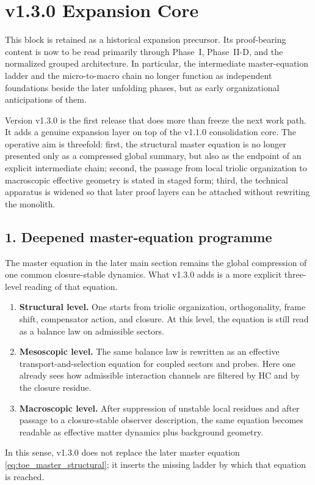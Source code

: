 \section*{v1.3.0 Expansion Core}

\begin{remark}
\label{rem:normalization-note-v130}
This block is retained as a historical expansion precursor. Its proof-bearing content is now to be read primarily through Phase~I, Phase~II-D, and the normalized grouped architecture. In particular, the intermediate master-equation ladder and the micro-to-macro chain no longer function as independent foundations beside the later unfolding phases, but as early organizational anticipations of them.
\end{remark}

Version v1.3.0 is the first release that does more than freeze the next
work path. It adds a genuine expansion layer on top of the v1.1.0
consolidation core. The operative aim is threefold: first, the structural
master equation is no longer presented only as a compressed global summary, but
also as the endpoint of an explicit intermediate chain; second, the passage
from local triolic organization to macroscopic effective geometry is stated in
staged form; third, the technical apparatus is widened so that later proof
layers can be attached without rewriting the monolith.

\subsection*{1. Deepened master-equation programme}
The master equation in the later main section remains the global compression of
one common closure-stable dynamics. What v1.3.0 adds is a more explicit
three-level reading of that equation.
\begin{enumerate}[leftmargin=2em,label=(\roman*)]
  \item \textbf{Structural level.} One starts from triolic organization,
  orthogonality, frame shift, compensator action, and closure. At this level,
  the equation is still read as a balance law on admissible sectors.
  \item \textbf{Mesoscopic level.} The same balance law is rewritten as an
  effective transport-and-selection equation for coupled sectors and probes.
  Here one already sees how admissible interaction channels are filtered by HC
  and by the closure residue.
  \item \textbf{Macroscopic level.} After suppression of unstable local
  residues and after passage to a closure-stable observer description, the same
  equation becomes readable as effective matter dynamics plus background
  geometry.
\end{enumerate}
In this sense, v1.3.0 does not replace the later master equation
\eqref{eq:toe_master_structural}; it inserts the missing ladder by which that
equation is reached.

